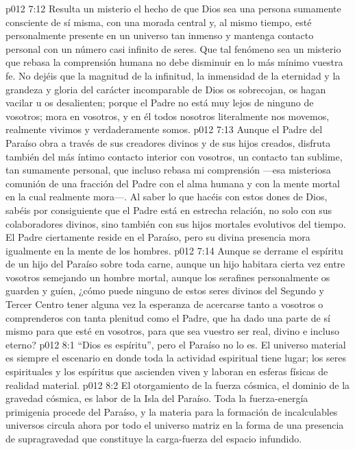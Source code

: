 \vs p012 7:12 \pc Resulta un misterio el hecho de que Dios sea una persona sumamente consciente de sí misma, con una morada central y, al mismo tiempo, esté personalmente presente en un universo tan inmenso y mantenga contacto personal con un número casi infinito de seres. Que tal fenómeno sea un misterio que rebasa la comprensión humana no debe disminuir en lo más mínimo vuestra fe. No dejéis que la magnitud de la infinitud, la inmensidad de la eternidad y la grandeza y gloria del carácter incomparable de Dios os sobrecojan, os hagan vacilar u os desalienten; porque el Padre no está muy lejos de ninguno de vosotros; mora en vosotros, y en él todos nosotros literalmente nos movemos, realmente vivimos y verdaderamente somos.
\vs p012 7:13 \pc Aunque el Padre del Paraíso obra a través de sus creadores divinos y de sus hijos creados, disfruta también del más íntimo contacto interior con vosotros, un contacto tan sublime, tan sumamente personal, que incluso rebasa mi comprensión ---esa misteriosa comunión de una fracción del Padre con el alma humana y con la mente mortal en la cual realmente mora---. Al saber lo que hacéis con estos dones de Dios, sabéis por consiguiente que el Padre está en estrecha relación, no solo con sus colaboradores divinos, sino también con sus hijos mortales evolutivos del tiempo. El Padre ciertamente reside en el Paraíso, pero su divina presencia mora igualmente en la mente de los hombres.
\vs p012 7:14 Aunque se derrame el espíritu de un hijo del Paraíso sobre toda carne, aunque un hijo habitara cierta vez entre vosotros semejando un hombre mortal, aunque los serafines personalmente os guarden y guíen, ¿cómo puede ninguno de estos seres divinos del Segundo y Tercer Centro tener alguna vez la esperanza de acercarse tanto a vosotros o comprenderos con tanta plenitud como el Padre, que ha dado una parte de sí mismo para que esté en vosotros, para que sea vuestro ser real, divino e incluso eterno?
\vs p012 8:1 “Dios es espíritu”, pero el Paraíso no lo es. El universo material es siempre el escenario en donde toda la actividad espiritual tiene lugar; los seres espirituales y los espíritus que ascienden viven y laboran en esferas físicas de realidad material.
\vs p012 8:2 \pc El otorgamiento de la fuerza cósmica, el dominio de la gravedad cósmica, es labor de la Isla del Paraíso. Toda la fuerza\hyp{}energía primigenia procede del Paraíso, y la materia para la formación de incalculables universos circula ahora por todo el universo matriz en la forma de una presencia de supragravedad que constituye la carga\hyp{}fuerza del espacio infundido.
